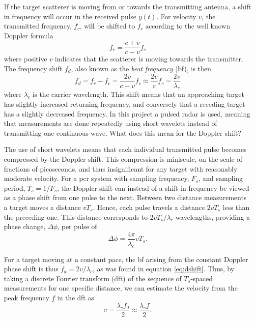 If the target scatterer is moving from or towards the transmitting antenna, a shift in frequency will occur in the received pulse $y(t)$. For velocity $v$, the transmitted frequency, $f_c$, will be shifted to $f_r$ according to the well known Doppler formula \citep{ridenour_1947}
\begin{equation}
	f_r = \frac{c + v}{c - v}f_c
\end{equation}
where positive $v$ indicates that the scatterer is moving towards the transmitter. The frequency shift $f_d$, also known as the \emph{beat frequency} (\gls{bf}), is then
\begin{equation}\label{eq:dshift}
	f_d 
	= f_r - f_c 
	= \frac{2v}{c-v}f_c \approx \frac{2v}{c}f_c 
	= \frac{2v}{\lambda_c}
\end{equation}
where $\lambda_c$ is the carrier wavelength. This shift means that an approaching target has slightly increased returning frequency, and conversely that a receding target has a slightly decreased frequency. In this project a pulsed radar is used, meaning that measurements are done repeatedly using short wavelets instead of transmitting one continuous wave. What does this mean for the Doppler shift?

The use of short wavelets means that each individual transmitted pulse becomes compressed by the Doppler shift. This compression is miniscule, on the scale of fractions of picoseconds, and thus insignificant for any target with reasonably moderate velocity. For a \gls{pcr} system with sampling frequency, $F_s$, and sampling period, $T_s = 1/F_s$, the Doppler shift can instead of a shift in frequency be viewed as a phase shift from one pulse to the next. Between two distance measurements a target moves a distance $vT_s$. Hence, each pulse travels a distance $2vT_s$ less than the preceding one. This distance corresponds to $2vT_s/\lambda_c$ wavelengths, providing a phase change, $\Delta \phi$, per pulse of
\begin{equation}
	\Delta \phi = \frac{4\pi}{\lambda_c}vT_s.
\end{equation}

For a target moving at a constant pace, the \gls{bf} arising from the constant Doppler phase shift is thus $f_d = 2v/\lambda_c$, as was found in equation \eqref{eq:dshift}. Thus, by taking a discrete Fourier transform (\gls{dft}) of the sequence of $T_s$-spaced measurements for one specific distance, we can estimate the velocity from the peak frequency $f$ in the \gls{dft} as 
\begin{equation}\label{eq:dopp}
	v = \frac{\lambda_c f_d}{2}
	\approx \frac{\lambda_c f}{2}.
\end{equation}


